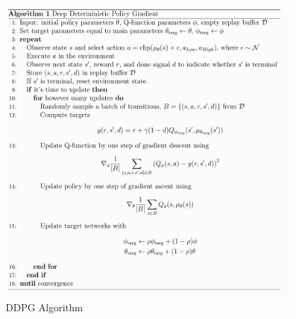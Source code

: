 \documentclass[letterpaper,12pt,addpoints]{exam}
\begin{document}
\begin{figure}[h!]
    \centering
    \includegraphics[width=0.95\textwidth]{imgs/ddpg.png}
    \caption{DDPG Algorithm}
    \label{fig:ddpg}
\end{figure}


\newpage 
\end{document}
